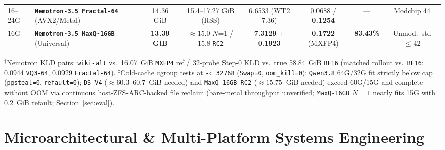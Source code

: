 \documentclass[10pt,twocolumn]{article}
\begin{document}
\begin{table}[t]
\begin{tabularx}{\textwidth}{@{}l>{\raggedright\arraybackslash}p{3.45cm}cccccc@{}}
16--24G & \textbf{\texttt{Nemotron-3.5 Fractal-64}} (AVX2/Metal) & 14.36 GiB & 15.4--17.27 GiB (RSS) & 6.6533 (WT2 7.36) & 0.0688 / \textbf{0.1254}\rlap{$^\dagger$} & --- & Modchip 44 \\
16G & \textbf{\texttt{Nemotron-3.5 MaxQ-16GB}} (Universal) & \textbf{13.39 GiB} & ${\approx}15.0$ $N$=1 / 15.8 \texttt{RC2}\rlap{$^\ddagger$} & \textbf{7.3129 $\pm$ 0.1923} & \textbf{0.1722} (MXFP4) & \textbf{83.43\%} & Unmod.\ std $\le 42$ \\
\bottomrule
\end{tabularx}
\vspace{2pt}
\raggedright\scriptsize $^\dagger$Nemotron KLD pairs: \texttt{wiki-alt} vs.\ 16.07~GiB \texttt{MXFP4} ref / 32-probe Step-0 KLD vs.\ true 58.84~GiB \texttt{BF16} (matched rollout vs.\ \texttt{BF16}: 0.0944 \texttt{VQ3-64}, 0.0929 \texttt{Fractal-64}). $^\ddagger$Cold-cache cgroup tests at \texttt{-c 32768} (\texttt{Swap=0}, \texttt{oom\_kill=0}): \texttt{Qwen3.8} 64G/32G fit strictly below cap (\texttt{pgsteal=0}, \texttt{refault=0}); \texttt{DS-V4} (${\approx}60.3$--$60.7$~GiB needed) and \texttt{MaxQ-16GB RC2} (${\approx}15.75$~GiB needed) exceed 60G/15G and complete without OOM via continuous host-ZFS-ARC-backed file reclaim (bare-metal throughput unverified; \texttt{MaxQ-16GB} $N=1$ nearly fits 15G with 0.2~GiB refault; Section~\ref{sec:eval}).
\end{table}

\section{Microarchitectural \& Multi-Platform Systems Engineering}
\label{sec:sys}
\end{document}
